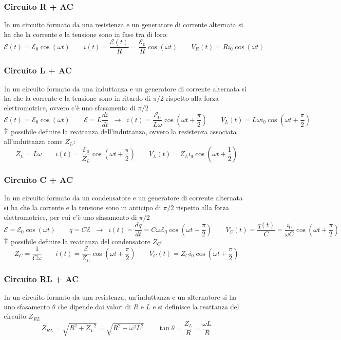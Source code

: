 \documentclass[a4paper]{article}
\begin{document}
\subsubsection*{Circuito R + AC}
In un circuito formato da una resistenza e un generatore di corrente alternata si ha che la corrente e la tensione sono in fase
tra di loro:
\[\mathcal{E}(t) = \mathcal{E}_0 \cos(\omega t) \qquad i(t) = \frac{\mathcal{E}(t)}{R} = \frac{\mathcal{E}_0}{R} \cos(\omega t) \qquad V_R(t) = R i_0 \cos(\omega t)\]

\subsubsection*{Circuito L + AC}
In un circuito formato da una induttanza e un generatore di corrente alternata si ha che la corrente e la tensione sono in ritardo
di \(\pi/2\) rispetto alla forza elettromotrice, ovvero c'è uno sfasamento di \(\pi/2\)
\[\mathcal{E}(t) = \mathcal{E}_0 \cos(\omega t) \qquad \mathcal{E} = L \frac{di}{dt} \;\;\rightarrow\;\; i(t) = \frac{\mathcal{E}_0}{L\omega} \cos \left( \omega t + \frac{\pi}{2} \right) \qquad V_L(t) = L \omega i_0 \cos \left( \omega t + \frac{\pi}{2} \right)\]
È possibile definire la reattanza dell'induttanza, ovvero la resistenza associata all'induttanza come \(Z_L\):
\[Z_L = L\omega \qquad i(t) = \frac{\mathcal{E}_0}{Z_L} \cos \left( \omega t + \frac{\pi}{2} \right) \qquad V_L(t) = Z_L i_0 \cos(\omega t + \frac{1}{2})\]

\subsubsection*{Circuito C + AC}
In un circuito formato da un condensatore e un generatore di corrente alternata si ha che la corrente e la tensione sono in
anticipo di \(\pi/2\) rispetto alla forza elettromotrice, per cui c'è uno sfasamento di \(\pi/2\)
\[\mathcal{E} = \mathcal{E}_0 \cos(\omega t) \qquad q = C \mathcal{E} \;\;\rightarrow\;\; i(t) = \frac{dq}{dt} = C \omega \mathcal{E}_0 \cos \left( \omega t + \frac{\pi}{2} \right) \qquad V_C(t) = \frac{q(t)}{C} = \frac{i_0}{\omega C} \cos \left( \omega t + \frac{\pi}{2} \right)\]
È possibile definire la reattanza del condensatore \(Z_C\):
\[Z_C = \frac{1}{C \omega} \qquad i(t) = \frac{\mathcal{E}}{Z_C} \cos \left( \omega t + \frac{\pi}{2} \right) \qquad V_C(t) = Z_C i_0 \cos \left( \omega t + \frac{\pi}{2} \right)\]

\subsubsection*{Circuito RL + AC}
In un circuito formato da una resistenza, un'induttanza e un alternatore si ha uno sfasamento \(\theta\) che dipende dai valori
di \(R\) e \(L\) e si definisce la reattanza del circuito \(Z_{RL}\)
\[Z_{RL} = \sqrt{R^2 + {Z_L}^2} = \sqrt{R^2 + \omega^2 L^2} \qquad \tan \theta = \frac{Z_L}{R} = \frac{\omega L}{R}\]
\end{document}
